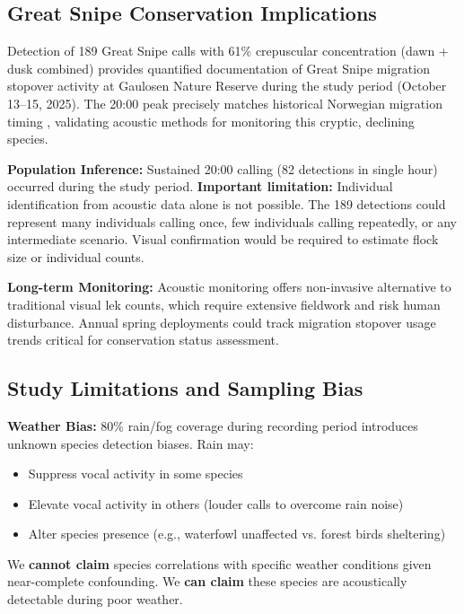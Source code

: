 \documentclass[twocolumn]{article}
\begin{document}
\subsection{Great Snipe Conservation Implications}

Detection of 189 Great Snipe calls with 61\% crepuscular concentration (dawn + dusk combined) provides quantified documentation of Great Snipe migration stopover activity at Gaulosen Nature Reserve during the study period (October 13--15, 2025). The 20:00 peak precisely matches historical Norwegian migration timing \citep{Kålås1995}, validating acoustic methods for monitoring this cryptic, declining species.

\textbf{Population Inference:} Sustained 20:00 calling (82 detections in single hour) occurred during the study period. \textbf{Important limitation:} Individual identification from acoustic data alone is not possible. The 189 detections could represent many individuals calling once, few individuals calling repeatedly, or any intermediate scenario. Visual confirmation would be required to estimate flock size or individual counts.

\textbf{Long-term Monitoring:} Acoustic monitoring offers non-invasive alternative to traditional visual lek counts, which require extensive fieldwork and risk human disturbance. Annual spring deployments could track migration stopover usage trends critical for conservation status assessment.

\subsection{Study Limitations and Sampling Bias}

\textbf{Weather Bias:} 80\% rain/fog coverage during recording period introduces unknown species detection biases. Rain may:
\begin{itemize}
\item Suppress vocal activity in some species
\item Elevate vocal activity in others (louder calls to overcome rain noise)
\item Alter species presence (e.g., waterfowl unaffected vs. forest birds sheltering)
\end{itemize}

We \textbf{cannot claim} species correlations with specific weather conditions given near-complete confounding. We \textbf{can claim} these species are acoustically detectable during poor weather.
\end{document}
